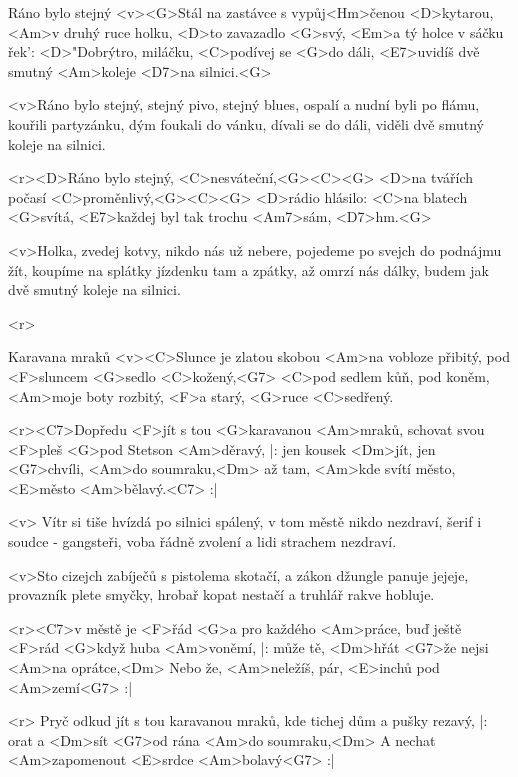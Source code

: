 \begin{song}{76}{Ráno bylo stejný}{}
	<v><G>Stál na zastávce s vypůj<Hm>čenou <D>kytarou,
	<Am>v druhý ruce holku, <D>to zavazadlo <G>svý,
	<Em>a tý holce v sáčku řek': <D>"Dobrýtro, miláčku,
	<C>podívej se <G>do dáli, <E7>uvidíš dvě smutný <Am>koleje <D7>na silnici.<G>

	<v>Ráno bylo stejný, stejný pivo, stejný blues,
	ospalí a nudní byli po flámu,
	kouřili partyzánku, dým foukali do vánku,
	dívali se do dáli, viděli dvě smutný koleje na silnici.

	<r><D>Ráno bylo stejný, <C>nesváteční,<G><C><G>
	<D>na tvářích počasí <C>proměnlivý,<G><C><G>
	<D>rádio hlásilo: <C>na blatech <G>svítá,
	<E7>každej byl tak trochu <Am7>sám, <D7>hm.<G>

	<v>Holka, zvedej kotvy, nikdo nás už nebere,
	pojedeme po svejch do podnájmu žít,
	koupíme na splátky jízdenku tam a zpátky,
	až omrzí nás dálky, budem jak dvě smutný koleje na silnici.

	<r>
\end{song}

\begin{song}{78}{Karavana mraků}{}
	<v><C>Slunce je zlatou skobou <Am>na vobloze přibitý,
	pod <F>sluncem <G>sedlo <C>kožený,<G7>
	<C>pod sedlem kůň, pod koněm, <Am>moje boty rozbitý,
	<F>a starý, <G>ruce <C>sedřený.

	<r><C7>Dopředu <F>jít s tou <G>karavanou <Am>mraků,
	schovat svou <F>pleš <G>pod Stetson <Am>děravý,
	|: jen kousek <Dm>jít, jen <G7>chvíli, <Am>do soumraku,<Dm>
	až tam, <Am>kde svítí město, <E>město <Am>bělavý.<C7> :|

	<v> Vítr si tiše hvízdá po silnici spálený,
	v tom městě nikdo nezdraví,
	šerif i soudce - gangsteři, voba řádně zvolení
	a lidi strachem nezdraví.

	<v>Sto cizejch zabíječů s pistolema skotačí,
	a zákon džungle panuje jejeje,
	provazník plete smyčky, hrobař kopat nestačí
	a truhlář rakve hobluje.

	<r><C7>v městě je <F>řád <G>a pro každého <Am>práce,
	buď ještě <F>rád <G>když huba <Am>voněmí,
	|: může tě, <Dm>hřát <G7>že nejsi <Am>na oprátce,<Dm>
	Nebo že, <Am>neležíš, pár, <E>inchů pod <Am>zemí<G7> :|

	<r> Pryč odkud jít s tou karavanou mraků,
	kde tichej dům a pušky rezavý,
	|: orat a <Dm>sít <G7>od rána <Am>do soumraku,<Dm>
	A nechat <Am>zapomenout <E>srdce <Am>bolavý<G7> :|
\end{song}

